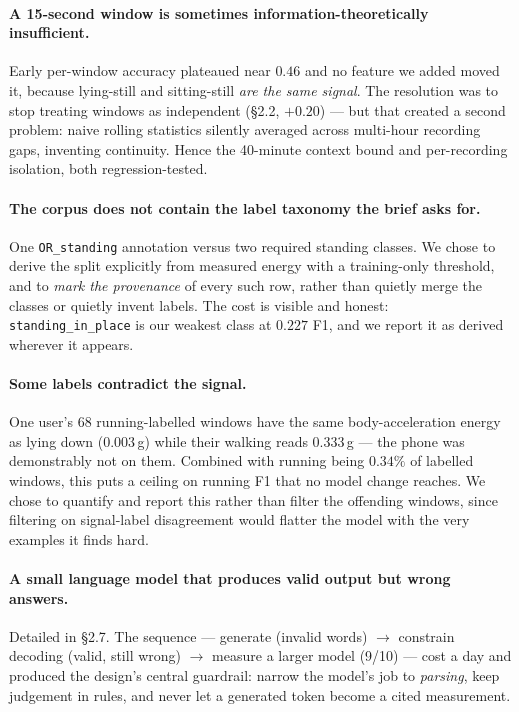 \documentclass[11pt,a4paper]{article}
\newcommand{\code}[1]{\texttt{\small #1}}
\begin{document}
\paragraph{A 15-second window is sometimes information-theoretically insufficient.} Early
per-window accuracy plateaued near $0.46$ and no feature we added moved it, because
lying-still and sitting-still \emph{are the same signal}. The resolution was to stop
treating windows as independent (\S2.2, $+0.20$) --- but that created a second problem:
naive rolling statistics silently averaged across multi-hour recording gaps, inventing
continuity. Hence the 40-minute context bound and per-recording isolation, both
regression-tested.

\paragraph{The corpus does not contain the label taxonomy the brief asks for.} One
\code{OR\_standing} annotation versus two required standing classes. We chose to derive
the split explicitly from measured energy with a training-only threshold, and to
\emph{mark the provenance} of every such row, rather than quietly merge the classes or
quietly invent labels. The cost is visible and honest: \code{standing\_in\_place} is our
weakest class at $0.227$ F1, and we report it as derived wherever it appears.

\paragraph{Some labels contradict the signal.} One user's 68 running-labelled windows
have the same body-acceleration energy as lying down ($0.003$\,g) while their walking
reads $0.333$\,g --- the phone was demonstrably not on them. Combined with running being
$0.34\%$ of labelled windows, this puts a ceiling on running F1 that no model change
reaches. We chose to quantify and report this rather than filter the offending windows,
since filtering on signal-label disagreement would flatter the model with the very
examples it finds hard.

\paragraph{A small language model that produces valid output but wrong answers.} Detailed
in \S2.7. The sequence --- generate (invalid words) $\rightarrow$ constrain decoding
(valid, still wrong) $\rightarrow$ measure a larger model (9/10) --- cost a day and
produced the design's central guardrail: narrow the model's job to \emph{parsing}, keep
judgement in rules, and never let a generated token become a cited measurement.
\end{document}
